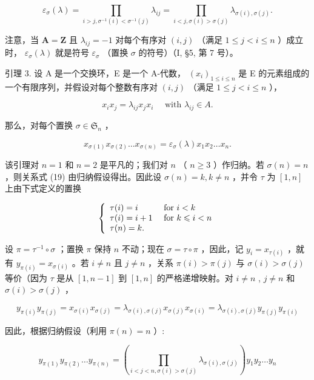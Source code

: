 \[
\varepsilon_ {\sigma} (\lambda) = \prod_ {i > j, \sigma^ {- 1} (i) < \sigma^ {- 1} (j)} \lambda_ {i j} = \prod_ {i <   j, \sigma (i) > \sigma (j)} \lambda_ {\sigma (i), \sigma (j)}.\tag{17}
\]

注意，当 \(\mathbf{A} = \mathbf{Z}\) 且 \(\lambda_{ij} = -1\) 对每个有序对 \((i,j)\) （满足 \(1 \leqslant j < i \leqslant n\) ）成立时， \(\varepsilon_{\sigma}(\lambda)\) 就是符号 \(\varepsilon_{\sigma}\) （置换 \(\sigma\) 的符号）（I, §5, 第 7 号）。

引理 3. 设 A 是一个交换环，E 是一个 A-代数， \((x_{i})_{1\leqslant i\leqslant n}\) 是 E 的元素组成的一个有限序列，并假设对每个整数有序对 \((i,j)\) （满足 \(1\leqslant j < i\leqslant n\) ），

\[
x _ {i} x _ {j} = \lambda_ {i j} x _ {j} x _ {i} \quad \text { with } \lambda_ {i j} \in A.\tag{18}
\]

那么，对每个置换 \(\sigma \in \mathfrak{S}_n\) ，

\[
x _ {\sigma (1)} x _ {\sigma (2)} \dots x _ {\sigma (n)} = \varepsilon_ {\sigma} (\lambda) x _ {1} x _ {2} \dots x _ {n}.\tag{19}
\]

该引理对 \(n = 1\) 和 \(n = 2\) 是平凡的；我们对 \(n\) （ \(n \geqslant 3\) ）作归纳。若 \(\sigma(n) = n\) ，则关系式 (19) 由归纳假设得出。因此设 \(\sigma(n) = k, k \neq n\) ，并令 \(\tau\) 为 \([1, n]\) 上由下式定义的置换

\[
\left\{ \begin{array}{l l} \tau (i) = i & \text { for } i <   k \\ \tau (i) = i + 1 & \text { for } k \leqslant i <   n \\ \tau (n) = k. \end{array} \right.
\]

设 \(\pi = \tau^{-1} \circ \sigma\) ；置换 \(\pi\) 保持 \(n\) 不动；现在 \(\sigma = \tau \circ \pi\) ，因此，记 \(y_i = x_{\tau(i)}\) ，就有 \(y_{\pi(i)} = x_{\sigma(i)}\) 。若 \(i \neq n\) 且 \(j \neq n\) ，关系 \(\pi(i) > \pi(j)\) 与 \(\sigma(i) > \sigma(j)\) 等价（因为 \(\tau\) 是从 \([1, n - 1]\) 到 \([1, n]\) 的严格递增映射。对 \(i \neq n\) , \(j \neq n\) 和 \(\sigma(i) > \sigma(j)\) ，

\[
y _ {\pi (i)} y _ {\pi (j)} = x _ {\sigma (i)} x _ {\sigma (j)} = \lambda_ {\sigma (i), \sigma (j)} x _ {\sigma (j)} x _ {\sigma (i)} = \lambda_ {\sigma (i), \sigma (j)} y _ {\pi (j)} y _ {\pi (i)}
\]

因此，根据归纳假设（利用 \(\pi(n) = n\) ）:

\[
y _ {\pi (1)} y _ {\pi (2)} \dots y _ {\pi (n)} = \left(\prod_ {i <   j <   n, \sigma (i) > \sigma (j)} \lambda_ {\sigma (i), \sigma (j)}\right) y _ {1} y _ {2} \dots y _ {n}
\]

